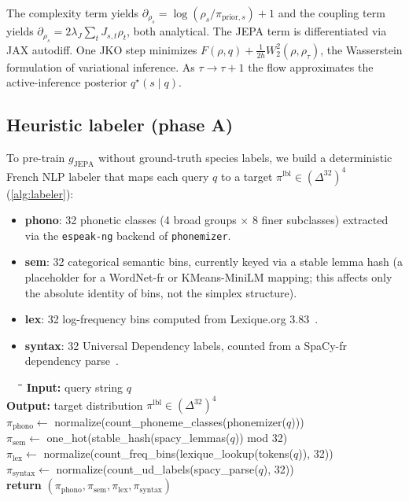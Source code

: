 The complexity term yields
$\partial_{\rho_s} = \log(\rho_s / \pi_{\mathrm{prior},s}) + 1$
and the coupling term yields
$\partial_{\rho_s} = 2 \lambda_J \sum_{t} J_{s,t} \rho_t$,
both analytical. The JEPA term is differentiated via JAX autodiff.
One JKO step minimizes
$F(\rho, q) + \tfrac{1}{2h} W_2^2(\rho, \rho_\tau)$,
the Wasserstein formulation of variational inference. As
$\tau \to \tau+1$ the flow approximates the active-inference
posterior $q^\star(s \mid q)$.

\subsection{Heuristic labeler (phase A)}
\label{sec:labeler}

To pre-train $g_{\mathrm{JEPA}}$ without ground-truth species
labels, we build a deterministic French NLP labeler that maps each
query $q$ to a target
$\pi^{\mathrm{lbl}} \in (\Delta^{32})^4$
(\cref{alg:labeler}):

\begin{itemize}
    \item \textbf{phono}: 32 phonetic classes (4 broad groups
        $\times$ 8 finer subclasses) extracted via the
        \texttt{espeak-ng} backend of \texttt{phonemizer}.
    \item \textbf{sem}: 32 categorical semantic bins, currently
        keyed via a stable lemma hash (a placeholder for a
        WordNet-fr or KMeans-MiniLM mapping; this affects only
        the absolute identity of bins, not the simplex
        structure).
    \item \textbf{lex}: 32 log-frequency bins computed from
        Lexique.org 3.83~\citep{newboucard2004lexique,new2007subtitles}.
    \item \textbf{syntax}: 32 Universal Dependency labels,
        counted from a SpaCy-fr dependency
        parse~\citep{honnibal2020spacy}.
\end{itemize}

\begin{algorithm}[ht]
  \caption{Heuristic labeler (phase A target)}
  \label{alg:labeler}
  \small
  \begin{tabbing}
    ~~~\=\quad\=\quad\=\quad\kill
    \textbf{Input:} query string $q$ \\
    \textbf{Output:} target distribution
        $\pi^{\mathrm{lbl}} \in (\Delta^{32})^4$ \\[1ex]
    \> $\pi_{\mathrm{phono}} \leftarrow$ normalize(count\_phoneme\_classes(phonemizer($q$))) \\
    \> $\pi_{\mathrm{sem}}   \leftarrow$ one\_hot(stable\_hash(spacy\_lemmas($q$)) mod 32) \\
    \> $\pi_{\mathrm{lex}}   \leftarrow$ normalize(count\_freq\_bins(lexique\_lookup(tokens($q$)), 32)) \\
    \> $\pi_{\mathrm{syntax}} \leftarrow$ normalize(count\_ud\_labels(spacy\_parse($q$), 32)) \\
    \> \textbf{return} $(\pi_{\mathrm{phono}}, \pi_{\mathrm{sem}}, \pi_{\mathrm{lex}}, \pi_{\mathrm{syntax}})$
  \end{tabbing}
\end{algorithm}

